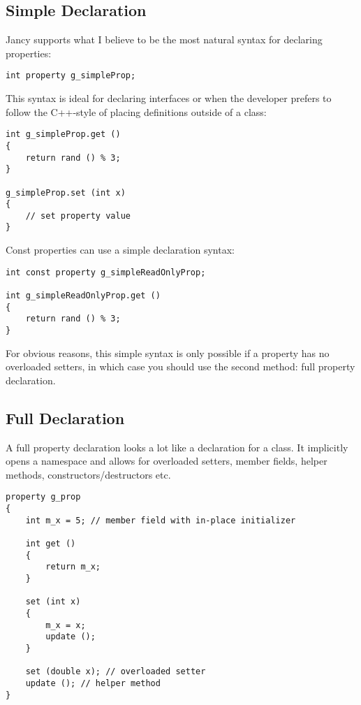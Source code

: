 \documentclass[oneside]{book}
\begin{document}
\subsection{Simple Declaration}

Jancy supports what I believe to be the most natural syntax for declaring properties:

\begin{lstlisting}
int property g_simpleProp;
\end{lstlisting}

This syntax is ideal for declaring interfaces or when the developer prefers to follow the C++-style of placing definitions outside of a class:

\begin{lstlisting}
int g_simpleProp.get ()
{
    return rand () % 3;
}

g_simpleProp.set (int x)
{
    // set property value
}
\end{lstlisting}

Const properties can use a simple declaration syntax:

\begin{lstlisting}
int const property g_simpleReadOnlyProp;

int g_simpleReadOnlyProp.get ()
{
    return rand () % 3;
}
\end{lstlisting}

For obvious reasons, this simple syntax is only possible if a property has no overloaded setters, in which case you should use the second method: full property declaration.

\subsection{Full Declaration}

A full property declaration looks a lot like a declaration for a class. It implicitly opens a namespace and allows for overloaded setters, member fields, helper methods, constructors/destructors etc.

\begin{lstlisting}
property g_prop
{
    int m_x = 5; // member field with in-place initializer

    int get ()
    {
        return m_x;
    }

    set (int x) 
    {
        m_x = x;
        update ();
    }   
        
    set (double x); // overloaded setter
    update (); // helper method
}
\end{lstlisting}
\end{document}
